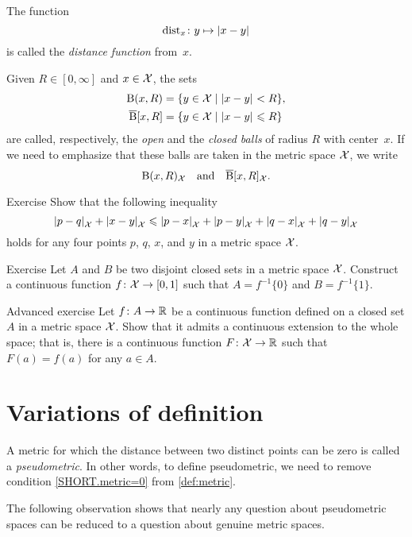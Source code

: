 The function 
\[\distfun_x\:y\mapsto \dist{x}{y}{}\]
is called the \emph{distance function} from~$x$. 

Given $R\in[0,\infty]$ and $x\in \mathcal{X}$, the sets
\begin{align*}
\oBall(x,R)&=\{y\in \spc{X}\mid \dist{x}{y}{}<R\},
\\
\cBall[x,R]&=\{y\in \spc{X}\mid \dist{x}{y}{}\le R\}
\end{align*}
are called, respectively, the  \emph{open} and  the \emph{closed  balls}   of radius $R$ with center~$x$.
If we need to emphasize that these balls are taken in the metric space $\mathcal{X}$,
we write 
\[\mathrm{B}{}(x,R)_{\mathcal{X}}\quad\text{and}\quad\overline{\mathrm{B}}{}[x,R]_{\mathcal{X}}.\]

\begin{thm}{Exercise}\label{ex:quad-inq}
Show that the following inequality
\[\dist{p}{q}{\spc{X}}+\dist{x}{y}{\spc{X}}\le\dist{p}{x}{\spc{X}}+\dist{p}{y}{\spc{X}}+\dist{q}{x}{\spc{X}}+\dist{q}{y}{\spc{X}}\]
holds for any four points $p$, $q$, $x$, and $y$ in a metric space $\mathcal{X}$.
\end{thm}

\begin{thm}{Exercise}\label{ex:normal}
Let $A$ and $B$ be two disjoint closed sets in a metric space $\mathcal{X}$.
Construct a continuous function $f\colon\mathcal{X}\to [0,1]$ such that $A=f^{-1}\{0\}$ and $B=f^{-1}\{1\}$.
\end{thm}

\begin{thm}{Advanced exercise}\label{ex:tietze}
Let $f\colon A\to\mathbb{R}$ be a continuous function defined on a closed set $A$ in a metric space $\mathcal{X}$.
Show that it admits a continuous extension to the whole space;
that is, there is a continuous function $F\colon\mathcal{X}\to\mathbb{R}$ such that $F(a)=f(a)$ for any $a\in A$.
\end{thm}



\section{Variations of definition}

A metric for which the distance between two distinct points can be zero is called a \emph{pseudometric}.
In other words, to define pseudometric, we need to remove condition \ref{SHORT.metric=0} from \ref{def:metric}.

The following observation shows that
nearly any question about pseudometric spaces can be reduced to a question about genuine metric spaces.

